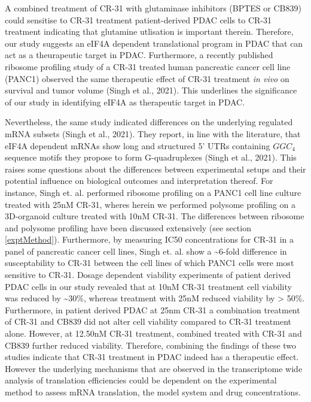\documentclass[12pt,openany]{book}
\begin{document}
A combined treatment of CR-31 with glutaminase inhibitors (BPTES or
CB839) could sensitise to CR-31 treatment patient-derived PDAC cells to
CR-31 treatment indicating that glutamine utlisation is important
therein. Therefore, our study suggests an eIF4A dependent translational
program in PDAC that can act as a theurapeutic target in PDAC.
Furthermore, a recently published ribosome profiling study of a CR-31
treated human pancreatic cancer cell line (PANC1) observed the same
therapeutic effect of CR-31 treatment \emph{in vivo} on survival and
tumor volume (Singh et al., 2021). This underlines the significance of
our study in identifying eIF4A as therapeutic target in PDAC.

Nevertheless, the same study indicated differences on the underlying
regulated mRNA subsets (Singh et al., 2021). They report, in line with
the literature, that eIF4A dependent mRNAs show long and structured 5'
UTRs containing \(GGC_4\) sequence motifs they propose to form
G-quadruplexes (Singh et al., 2021). This raises some questions about
the differences between experimental setups and their potential
influence on biological outcomes and interpretation thereof. For
instance, Singh et. al. performed ribosome profiling on a PANC1 cell
line culture treated with 25nM CR-31, wheres herein we performed
polysome profiling on a 3D-organoid culture treated with 10nM CR-31. The
differences between ribosome and polysome profiling have been discussed
extensively (see section \ref{exptMethod}). Furthermore, by measuring
IC50 concentrations for CR-31 in a panel of pancreatic cancer cell
lines, Singh et. al. show a \textasciitilde{}6-fold difference in
susceptability to CR-31 between the cell lines of which PANC1 cells were
most sensitive to CR-31. Dosage dependent viability experiments of
patient derived PDAC cells in our study revealed that at 10nM CR-31
treatment cell viability was reduced by \textasciitilde{}30\%, whereas
treatment with 25nM reduced viability by \textgreater{} 50\%.
Furthermore, in patient derived PDAC at 25nm CR-31 a combination
treatment of CR-31 and CB839 did not alter cell viability compared to
CR-31 treatment alone. However, at 12.50nM CR-31 treatment, combined
treated with CR-31 and CB839 further reduced viability. Therefore,
combining the findings of these two studies indicate that CR-31
treatment in PDAC indeed has a therapeutic effect. However the
underlying mechanisms that are observed in the transcriptome wide
analysis of translation efficiencies could be dependent on the
experimental method to assess mRNA translation, the model system and
drug concentrations. \newline
\end{document}
